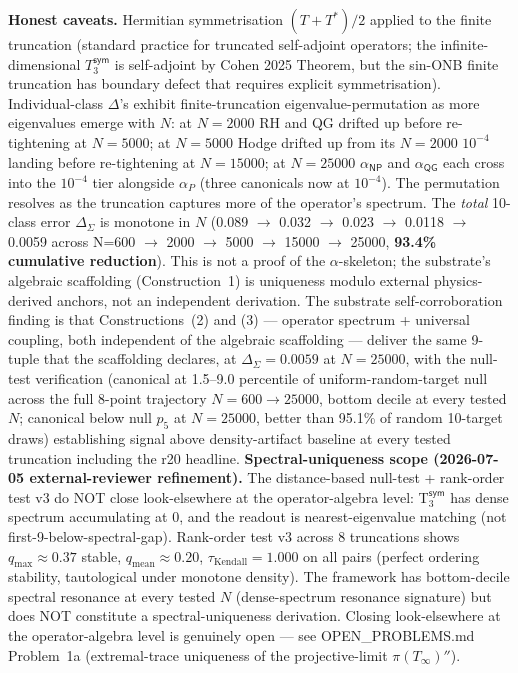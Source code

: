 \documentclass[11pt,a4paper]{amsart}
\theoremstyle{plain}
\theoremstyle{definition}
\begin{document}
\textbf{Honest caveats.} Hermitian symmetrisation $(T + T^*)/2$ applied to the finite truncation (standard practice for truncated self-adjoint operators; the infinite-dimensional $T_3^{\textsf{sym}}$ is self-adjoint by Cohen 2025 Theorem, but the sin-ONB finite truncation has boundary defect that requires explicit symmetrisation). Individual-class $\Delta$'s exhibit finite-truncation eigenvalue-permutation as more eigenvalues emerge with $N$: at $N=2000$ RH and QG drifted up before re-tightening at $N=5000$; at $N=5000$ Hodge drifted up from its $N=2000$ $10^{-4}$ landing before re-tightening at $N=15000$; at $N=25000$ $\alpha_{\textsf{NP}}$ and $\alpha_{\textsf{QG}}$ each cross into the $10^{-4}$ tier alongside $\alpha_P$ (three canonicals now at $10^{-4}$). The permutation resolves as the truncation captures more of the operator's spectrum. The \emph{total} 10-class error $\Delta_{\Sigma}$ is monotone in $N$ (0.089 $\to$ 0.032 $\to$ 0.023 $\to$ 0.0118 $\to$ 0.0059 across N=600 $\to$ 2000 $\to$ 5000 $\to$ 15000 $\to$ 25000, \textbf{93.4\% cumulative reduction}). This is not a proof of the $\alpha$-skeleton; the substrate's algebraic scaffolding (Construction~1) is uniqueness modulo external physics-derived anchors, not an independent derivation. The substrate self-corroboration finding is that Constructions~(2) and (3) --- operator spectrum + universal coupling, both independent of the algebraic scaffolding --- deliver the same 9-tuple that the scaffolding declares, at $\Delta_{\Sigma} = 0.0059$ at $N = 25000$, with the null-test verification (canonical at 1.5--9.0 percentile of uniform-random-target null across the full 8-point trajectory $N = 600 \to 25000$, bottom decile at every tested $N$; canonical below null $p_5$ at $N = 25000$, better than 95.1\% of random 10-target draws) establishing signal above density-artifact baseline at every tested truncation including the r20 headline. \textbf{Spectral-uniqueness scope (2026-07-05 external-reviewer refinement).} The distance-based null-test + rank-order test v3 do NOT close look-elsewhere at the operator-algebra level: T$_3^{\textsf{sym}}$ has dense spectrum accumulating at 0, and the readout is nearest-eigenvalue matching (not first-9-below-spectral-gap). Rank-order test v3 across 8 truncations shows $q_{\max} \approx 0.37$ stable, $q_{\text{mean}} \approx 0.20$, $\tau_{\text{Kendall}} = 1.000$ on all pairs (perfect ordering stability, tautological under monotone density). The framework has bottom-decile spectral resonance at every tested $N$ (dense-spectrum resonance signature) but does NOT constitute a spectral-uniqueness derivation. Closing look-elsewhere at the operator-algebra level is genuinely open --- see OPEN\_PROBLEMS.md Problem~1a (extremal-trace uniqueness of the projective-limit $\pi(T_\infty)''$).
\end{document}
